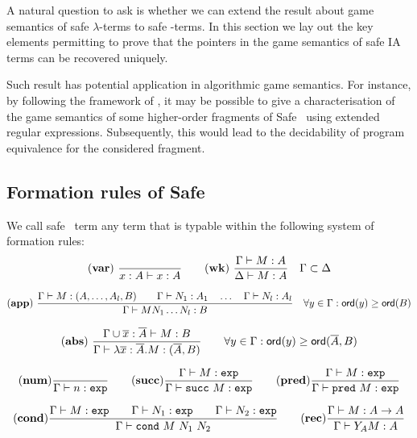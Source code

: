 A natural question to ask is whether we can extend the result about
game semantics of safe $\lambda$-terms to safe \ialgol-terms. In
this section we lay out the key elements permitting to prove that
the pointers in the game semantics of safe IA terms can be recovered
uniquely.

Such result has potential application in algorithmic game semantics.
For instance, by following the framework of \cite{ghicamccusker00},
it may be possible to give a characterisation of the game semantics
of some higher-order fragments of Safe \ialgol\ using extended
regular expressions. Subsequently, this would lead to the
decidability of program equivalence for the considered fragment.


\subsection{Formation rules of Safe \ialgol}
We call safe \ialgol\ term any term that is typable within the
following system of formation rules:
$$ \mathbf{(var)} \   \frac{\displaystyle }{x : A\vdash x : A}
\qquad  \mathbf{(wk)} \   \frac{\displaystyle \Gamma \vdash M : A}{\Delta \vdash
M : A} \quad  \Gamma \subset \Delta$$

$$ \mathbf{(app)} \  \frac{\displaystyle \Gamma \vdash M : (A,\ldots,A_l,B)
                                        \qquad \Gamma \vdash N_1 : A_1
                                        \quad \ldots \quad \Gamma \vdash N_l : A_l  }{\Gamma  \vdash M N_1 \ldots N_l : B}
                                    \quad
                                   \forall y \in \Gamma : {\sf ord}(y) \geq {\sf ord}(B)$$

$$ \mathbf{(abs)} \   \frac{\displaystyle \Gamma \cup \overline{x} : \overline{A} \vdash M : B}{\Gamma  \vdash \lambda \overline{x} : \overline{A} . M : (\overline{A},B)} \qquad
                                   \forall y \in \Gamma : {\sf ord}(y) \geq {\sf ord}(\overline{A},B)$$

$$ \mathbf{(num)} \frac{\displaystyle }{\Gamma \vdash n :\texttt{exp}}
\qquad \mathbf{(succ)} \frac{\displaystyle \Gamma \vdash M:\texttt{exp} }{\Gamma
\vdash \texttt{succ}\ M:\texttt{exp}} \qquad \mathbf{(pred)}
\frac{\displaystyle \Gamma \vdash M:\texttt{exp} }{\Gamma \vdash \texttt{pred}\
M:\texttt{exp}}$$

$$
\mathbf{(cond)} \frac{\displaystyle \Gamma \vdash M : \texttt{exp} \qquad \Gamma
\vdash N_1 : \texttt{exp} \qquad \Gamma \vdash N_2 : \texttt{exp}
}{\Gamma \vdash \texttt{cond}\ M\ N_1\ N_2} \qquad  \mathbf{(rec)}
\frac{\displaystyle \Gamma \vdash M : A\rightarrow A }{ \Gamma \vdash Y_A M :
A}$$

